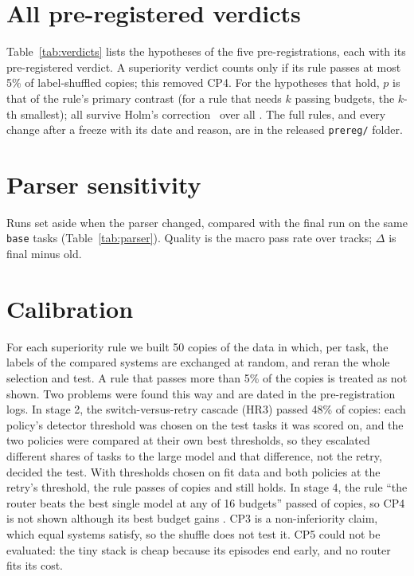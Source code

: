 \section{All pre-registered verdicts}\label{app:verdicts}

Table~\ref{tab:verdicts} lists the \nHypotheses{} hypotheses of the five pre-registrations, each with its pre-registered
verdict. A superiority verdict counts only if its rule passes at most 5\% of label-shuffled copies; this removed
CP4. For the hypotheses that hold, $p$ is that of the rule's primary contrast (for a rule that needs $k$ passing
budgets, the $k$-th smallest); all \nHolm{} survive Holm's correction~\cite{holm1979} over all \nHypotheses. The full
rules, and every change after a freeze with its date and reason, are in the released \texttt{prereg/} folder.

\begin{table}
  \caption{The pre-registered hypotheses and their verdicts.}\label{tab:verdicts}
  \small\verdictTable
\end{table}

\section{Parser sensitivity}\label{app:parser}

Runs set aside when the parser changed, compared with the final run on the same \texttt{base} tasks
(Table~\ref{tab:parser}). Quality is the macro pass rate over tracks; $\Delta$ is final minus old.

\begin{table}
  \caption{Old-parser runs against the final parser on the same tasks.}\label{tab:parser}
  \small\parserTable
\end{table}

\section{Calibration}\label{app:calibration}

For each superiority rule we built 50 copies of the data in which, per task, the labels of the compared systems are
exchanged at random, and reran the whole selection and test. A rule that passes more than 5\% of the copies is
treated as not shown. Two problems were found this way and are dated in the pre-registration logs. In stage 2, the
switch-versus-retry cascade (HR3) passed 48\% of copies: each policy's detector threshold was chosen on the test
tasks it was scored on, and the two policies were compared at their own best thresholds, so they escalated
different shares of tasks to the large model and that difference, not the retry, decided the test. With thresholds
chosen on fit data and both policies at the retry's threshold, the rule passes \switchFalse{} of copies and still
holds. In stage 4, the rule ``the router beats the best single model at any of 16 budgets'' passed \cpFourFalse{} of
copies, so CP4 is not shown although its best budget gains \routerVsSingle\pp. CP3 is a non-inferiority claim, which
equal systems satisfy, so the shuffle does not test it. CP5 could not be evaluated: the tiny stack is cheap because
its episodes end early, and no router fits its cost.
